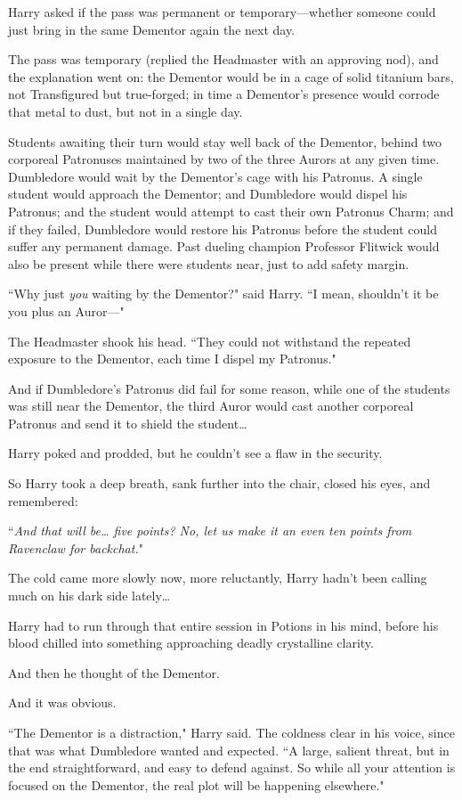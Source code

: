 Harry asked if the pass was permanent or temporary—whether someone could just bring in the same Dementor again the next day.

The pass was temporary (replied the Headmaster with an approving nod), and the explanation went on: the Dementor would be in a cage of solid titanium bars, not Transfigured but true-forged; in time a Dementor's presence would corrode that metal to dust, but not in a single day.

Students awaiting their turn would stay well back of the Dementor, behind two corporeal Patronuses maintained by two of the three Aurors at any given time. Dumbledore would wait by the Dementor's cage with his Patronus. A single student would approach the Dementor; and Dumbledore would dispel his Patronus; and the student would attempt to cast their own Patronus Charm; and if they failed, Dumbledore would restore his Patronus before the student could suffer any permanent damage. Past dueling champion Professor Flitwick would also be present while there were students near, just to add safety margin.

``Why just \emph{you} waiting by the Dementor?" said Harry. ``I mean, shouldn't it be you plus an Auror—"

The Headmaster shook his head. ``They could not withstand the repeated exposure to the Dementor, each time I dispel my Patronus."

And if Dumbledore's Patronus did fail for some reason, while one of the students was still near the Dementor, the third Auror would cast another corporeal Patronus and send it to shield the student{\ldots}

Harry poked and prodded, but he couldn't see a flaw in the security.

So Harry took a deep breath, sank further into the chair, closed his eyes, and remembered:

``\emph{And that will be{\ldots} five points? No, let us make it an even ten points from Ravenclaw for backchat.}"

The cold came more slowly now, more reluctantly, Harry hadn't been calling much on his dark side lately{\ldots}

Harry had to run through that entire session in Potions in his mind, before his blood chilled into something approaching deadly crystalline clarity.

And then he thought of the Dementor.

And it was obvious.

``The Dementor is a distraction," Harry said. The coldness clear in his voice, since that was what Dumbledore wanted and expected. ``A large, salient threat, but in the end straightforward, and easy to defend against. So while all your attention is focused on the Dementor, the real plot will be happening elsewhere."

